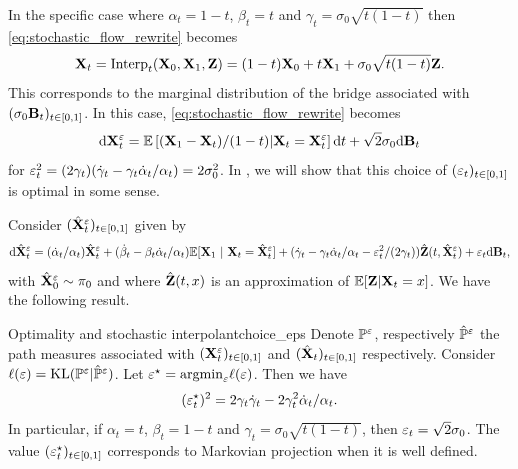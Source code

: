\documentclass{article}
\begin{document}
In the specific case where $\alpha_t = 1-t$, $\beta_t = t$ and $\gamma_t = \sigma_0 \sqrt{t(1-t)}$ then \eqref{eq:stochastic_flow_rewrite} becomes
\begin{equation}
\label{eq:interpolation_brownian_motion_appendix}
    \bfX_t = \mathrm{Interp}_t(\bfX_0, \bfX_1, \bfZ) = (1-t) \bfX_0 + t \bfX_1 + \sigma_0 \sqrt{t(1-t)} \bfZ.
\end{equation} 
This corresponds to the marginal distribution of the bridge associated with $(\sigma_0 \mathbf{B}_t)_{t \in [0,1]}$. In this case, \eqref{eq:stochastic_flow_rewrite} becomes
\begin{equation}
\label{eq:markov_projection}
    \rmd \bfX_t^\vareps = \mathbb{E}\left[(\bfX_1 - \bfX_t)/(1-t) | \bfX_t = \bfX_t^\vareps\right] \rmd t + \sqrt{2} \sigma_0 \rmd \bfB_t  
\end{equation}
for $\varepsilon_t^2 = (2\gamma_t)(\dot{\gamma}_t - \gamma_t \dot{\alpha}_t / \alpha_t)=2\sigma^2_0$. In , we will show that this choice of $(\varepsilon_t)_{t \in [0,1]}$ is optimal in some sense. 

Consider $(\hat{\mathbf{X}}_t^\varepsilon)_{t \in [0,1]}$ given by 
\begin{equation}
\label{eq:stochastic_flow_rewrite_approximate}
        \rmd \hat{\bfX}_t^\vareps = (\dot{\alpha}_t/\alpha_t) \hat{\bfX}_t^\vareps + (\dot{\beta}_t - \beta_t \dot{\alpha}_t / \alpha_t) \mathbb{E}[\bfX_1 \ | \ \bfX_t = \hat{\bfX}_t^\vareps] + (\dot{\gamma}_t - \gamma_t \dot{\alpha}_t/\alpha_t -  \vareps_t^2 /(2\gamma_t)) \hat{\bfZ}(t, \hat{\bfX}_t^\vareps)  + \vareps_t \rmd \bfB_t , 
\end{equation}
with $\hat{\mathbf{X}}_0^\varepsilon \sim \pi_0$ and 
where $\hat{\mathbf{Z}}(t, x)$ is an approximation of $\mathbb{E}[ \mathbf{Z} | \mathbf{X}_t = x]$. We have the following result. 

\begin{proposition}{Optimality and stochastic interpolant}{choice_eps}
Denote $\mathbb{P}^\varepsilon$, respectively $\hat{\mathbb{P}}^\varepsilon$ the path measures associated with $(\mathbf{X}_t^\varepsilon)_{t \in [0,1]}$ and $(\hat{\mathbf{X}}_t)_{t \in [0,1]}$ respectively. 
Consider $\ell(\varepsilon) = \mathrm{KL}( \mathbb{P}^\varepsilon | \hat{\mathbb{P}}^\varepsilon)$. Let $\varepsilon^\star = \mathrm{argmin}_\varepsilon \ell(\varepsilon)$. Then we have 
\begin{equation}
    (\varepsilon^\star_t)^2 = 2 \gamma_t \dot{\gamma}_t - 2 \gamma_t^2 \dot{\alpha}_t/\alpha_t .
\end{equation}
In particular, if $\alpha_t = t$, $\beta_t = 1-t$ and $\gamma_t = \sigma_0 \sqrt{t (1-t)}$, then $\varepsilon_t = \sqrt{2} \sigma_0$. The value $(\varepsilon_t^\star)_{t \in [0,1]}$ corresponds to Markovian projection when it is well defined. 
\end{proposition}
\end{document}

